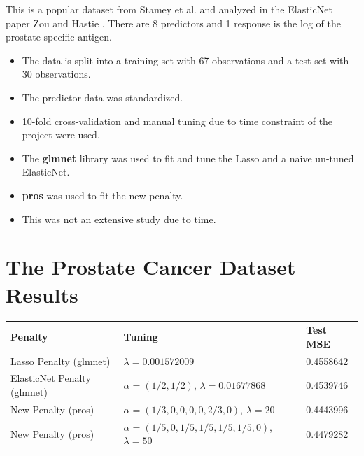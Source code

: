 \documentclass[10pt, reqno]{article}
\numberwithin{equation}{section}
\begin{document}
This is a popular dataset from Stamey et al. \cite{prostate} and analyzed in the ElasticNet paper Zou and Hastie \cite{elasticnet}.
There are 8 predictors and 1 response is the log of the prostate specific antigen.

\begin{itemize}
\item The data is split into a training set with 67 observations and a test set with 30 observations.

\item The predictor data was standardized.

\item 10-fold cross-validation and manual tuning due to time constraint of the project were used.

\item The \textbf{glmnet} \cite{glmnet} library was used to fit and tune the Lasso and a naive un-tuned ElasticNet.

\item \textbf{pros} \cite{pros} was used to fit the new penalty.

\item This was not an extensive study due to time.

\end{itemize}

\newpage
\section*{The Prostate Cancer Dataset Results}

\begin{center}
\begingroup
\setlength{\tabcolsep}{6pt} %
\renewcommand{\arraystretch}{2} %
\begin{tabular}{ l l l}
\textbf{Penalty} & \textbf{Tuning} & \textbf{Test MSE} \\
Lasso Penalty (glmnet) & $\lambda = 0.001572009$ & 0.4558642 \\
ElasticNet Penalty (glmnet) & $\alpha = (1/2, 1/2)$, $\lambda = 0.01677868$  & 0.4539746 \\
New Penalty (pros) & $\alpha = (1/3, 0, 0, 0, 0, 2/3, 0)$, $\lambda = 20$ & 0.4443996 \\
New Penalty (pros) & $\alpha = (1/5, 0, 1/5, 1/5, 1/5, 1/5, 0)$, $\lambda = 50$ & 0.4479282 \\
\end{tabular}
\endgroup
\end{center}
\end{document}
